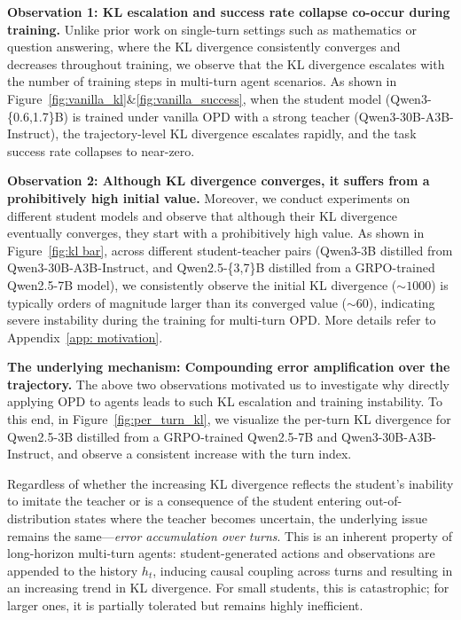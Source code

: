 \documentclass{article} %
\newcommand{\todo}[1]{\textcolor{red}{\textbf{TODO:} #1}}
\begin{document}

\textbf{Observation 1: KL escalation and success rate collapse co-occur during training.}
Unlike prior work on single-turn settings such as mathematics or question answering, 
where the KL divergence consistently converges and decreases throughout training, we observe that the KL divergence escalates with the number of training steps in multi-turn agent scenarios. 
As shown in Figure~\ref{fig:vanilla_kl}\&\ref{fig:vanilla_success}, when the student model (Qwen3-\{0.6,1.7\}B) is trained under vanilla OPD 
with a strong teacher (Qwen3-30B-A3B-Instruct), the trajectory-level KL divergence escalates rapidly, and the task success rate collapses to near-zero. 

\textbf{Observation 2: Although KL divergence converges, it suffers from a prohibitively high initial value.}
Moreover, we conduct experiments on different student models and observe that although their KL divergence eventually converges, they start with a prohibitively high value.
As shown in Figure~\ref{fig:kl bar}, across different student-teacher pairs (Qwen3-3B distilled from Qwen3-30B-A3B-Instruct, and Qwen2.5-\{3,7\}B distilled from a GRPO-trained Qwen2.5-7B model), we consistently observe the initial KL divergence ($\sim1000$) is typically orders of magnitude larger than its converged value ($\sim60$), indicating severe instability during the training for multi-turn OPD.
More details refer to Appendix~\ref{app: motivation}.

\textbf{The underlying mechanism: Compounding error amplification over the trajectory.}
The above two observations motivated us to investigate why directly applying OPD to agents leads to such KL escalation and training instability. 
To this end, in Figure~\ref{fig:per_turn_kl}, we visualize the per-turn KL divergence for Qwen2.5-3B distilled from a GRPO-trained Qwen2.5-7B and Qwen3-30B-A3B-Instruct, and observe a consistent increase with the turn index.

Regardless of whether the increasing KL divergence reflects the student’s inability to imitate the teacher or is a consequence of the student entering out-of-distribution states where the teacher becomes uncertain, the underlying issue remains the same—\textit{error accumulation over turns}. 
This is an inherent property of long-horizon multi-turn agents: student-generated actions and observations are appended to the history $h_t$, inducing causal coupling across turns and resulting in an increasing trend in KL divergence.
For small students, this is catastrophic; for larger ones, it is partially tolerated but remains highly inefficient.
\end{document}

